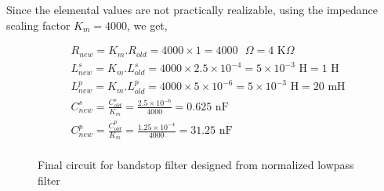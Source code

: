 Since the elemental values are not practically realizable, using the impedance scaling factor $K_m=4000$, we get,
\begin{fleqn}[\parindent]
   \begin{equation*}
      \begin{split}
         &R_{new}=K_m.R_{old}=4000\times1=4000 \text{ }\Omega=4\text{ K}\Omega\\
         &L_{new}^s=K_m.L_{old}^s=4000\times2.5\times10^{-4}=5\times10^{-3} \text{ H}=1\text{ H}\\
         &L_{new}^p=K_m.L_{old}^p=4000\times5\times10^{-6}=5\times10^{-3} \text{ H}=20\text{ mH}\\
         &C_{new}^s=\frac{C_{old}^s}{K_m}=\frac{2.5\times10^{-6}}{4000}=0.625 \text{ nF}\\
         &C_{new}^p=\frac{C_{old}^p}{K_m}=\frac{1.25\times10^{-4}}{4000}=31.25 \text{ nF}\\
      \end{split}
      \end{equation*}
\end{fleqn}

\begin{figure}[H]
   \centering
   \figd
   \caption{Final circuit for bandstop filter designed from normalized lowpass filter}
   \label{fig:figd}
\end{figure}